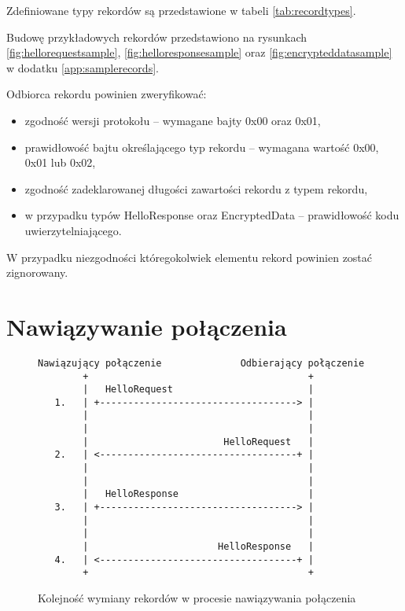 Zdefiniowane typy rekordów są przedstawione w tabeli \ref{tab:recordtypes}.

Budowę przykładowych rekordów przedstawiono na rysunkach \ref{fig:hellorequestsample}, \ref{fig:helloresponsesample} oraz \ref{fig:encrypteddatasample} w dodatku \ref{app:samplerecords}.

Odbiorca rekordu powinien zweryfikować:

\begin{itemize}
\item zgodność wersji protokołu -- wymagane bajty 0x00 oraz 0x01,
\item prawidłowość bajtu określającego typ rekordu -- wymagana wartość 0x00, 0x01 lub 0x02,
\item zgodność zadeklarowanej długości zawartości rekordu z typem rekordu,
\item w przypadku typów HelloResponse oraz EncryptedData -- prawidłowość kodu uwierzytelniającego.
\end{itemize}

W przypadku niezgodności któregokolwiek elementu rekord powinien zostać zignorowany.

\section{Nawiązywanie połączenia}

\begin{figure}
\centering
\begin{BVerbatim}
Nawiązujący połączenie              Odbierający połączenie
        +                                       +
        |   HelloRequest                        |
   1.   | +-----------------------------------> |
        |                                       |
        |                                       |
        |                        HelloRequest   |
   2.   | <-----------------------------------+ |
        |                                       |
        |                                       |
        |   HelloResponse                       |
   3.   | +-----------------------------------> |
        |                                       |
        |                                       |
        |                       HelloResponse   |
   4.   | <-----------------------------------+ |
        +                                       +
\end{BVerbatim}
\caption{Kolejność wymiany rekordów w procesie nawiązywania połączenia}
\label{fig:handshake}
\end{figure}

